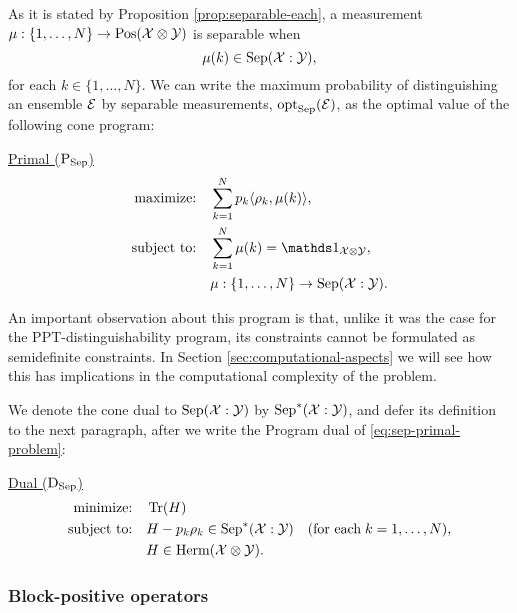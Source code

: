 As it is stated by Proposition \ref{prop:separable-each}, a measurement
$\mu : \{1,\ldots,N\} \rightarrow \mathrm{Pos}(\mathcal{X}\otimes\mathcal{Y})$ is separable when 
\begin{equation}
  \mu(k) \in \mathrm{Sep}(\mathcal{X}:\mathcal{Y}),
\end{equation}
for each $k\in\{1,\ldots,N\}$. We can write the maximum probability 
of distinguishing an ensemble $\mathcal{E}$ by separable measurements, 
$\operatorname{opt}_{\mathrm{Sep}}(\mathcal{E})$, as the optimal value of the following cone program: 
\begin{center}
\underline{Primal ($\textup{P}_{\mathrm{Sep}}$)}
\begin{equation}
  \label{eq:sep-primal-problem}
  \begin{split}
    \text{maximize:} \quad & 
      \sum_{k=1}^{N} p_{k}\ip{\rho_{k}}{\mu(k)},\\
    \text{subject to:} \quad & \sum_{k=1}^{N} \mu(k) = \I_{\X\otimes\Y},\\
        & \mu : \{1,\ldots, N\}\rightarrow \Sep(\X:\Y).
  \end{split}
\end{equation}
\end{center}

An important observation about this program is that, unlike it was the case for the 
PPT-distinguishability program, its constraints cannot be formulated as semidefinite constraints.
In Section \ref{sec:computational-aspects} we will see how this has 
implications in the computational complexity of the problem.

We denote the cone dual to $\mathrm{Sep}(\mathcal{X}:\mathcal{Y})$ by $\mathrm{Sep}^{\ast}(\mathcal{X}:\mathcal{Y})$, and defer its definition
to the next paragraph, after we write the Program dual of \eqref{eq:sep-primal-problem}:
\begin{center}
\underline{Dual ($\textup{D}_{\mathrm{Sep}}$)}
\begin{equation}
  \label{eq:sep-dual-problem}
  \begin{split}
    \text{minimize:} \quad & \operatorname{Tr}(H)\\
    \text{subject to:} \quad & H-p_k\rho_k\in\mathrm{Sep}^{\ast}(\mathcal{X}:\mathcal{Y})
    \quad(\text{for each}\;k = 1,\ldots,N),\\
    \quad & H \in \mathrm{Herm}(\mathcal{X}\otimes\mathcal{Y}).
  \end{split}
\end{equation}
\end{center}

\subsubsection{Block-positive operators}
\label{sec:block-positive-operators}

